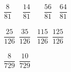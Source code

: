 \vspace{2em}



\noindent  
{}\ $ \dfrac{8}{81} $\quad\quad\  \ \ $ \dfrac{14}{81} $\qquad
\ \ \ $ \dfrac{56}{81} $\qquad \ \ $ \dfrac{64}{81} $
\\
\\
\ $ \dfrac{25}{126} $\qquad {}\ $ \dfrac{35}{126} $\qquad
{}\ $ \dfrac{115}{126} $\qquad {}\ $ \dfrac{125}{126} $ \\
\\
\ $ \dfrac{8}{729} $\qquad {}\ $ \dfrac{10}{729} $

